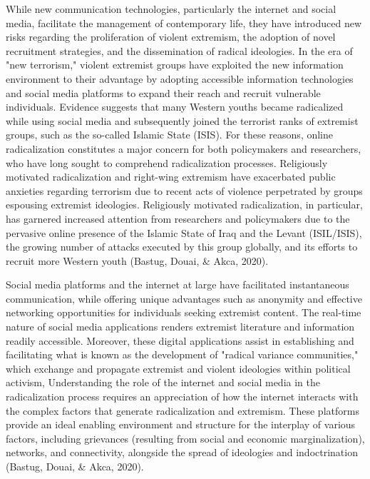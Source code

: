 \documentclass{NSP1}
\begin{document}
While new communication technologies, particularly the internet and social media, facilitate the management of contemporary life, they have introduced new risks regarding the proliferation of violent extremism, the adoption of novel recruitment strategies, and the dissemination of radical ideologies. In the era of "new terrorism," violent extremist groups have exploited the new information environment to their advantage by adopting accessible information technologies and social media platforms to expand their reach and recruit vulnerable individuals. Evidence suggests that many Western youths became radicalized while using social media and subsequently joined the terrorist ranks of extremist groups, such as the so-called Islamic State (ISIS). For these reasons, online radicalization constitutes a major concern for both policymakers and researchers, who have long sought to comprehend radicalization processes. Religiously motivated radicalization and right-wing extremism have exacerbated public anxieties regarding terrorism due to recent acts of violence perpetrated by groups espousing extremist ideologies. Religiously motivated radicalization, in particular, has garnered increased attention from researchers and policymakers due to the pervasive online presence of the Islamic State of Iraq and the Levant (ISIL/ISIS), the growing number of attacks executed by this group globally, and its efforts to recruit more Western youth (Bastug, Douai, \& Akca, 2020).

Social media platforms and the internet at large have facilitated instantaneous communication, while offering unique advantages such as anonymity and effective networking opportunities for individuals seeking extremist content. The real-time nature of social media applications renders extremist literature and information readily accessible. Moreover, these digital applications assist in establishing and facilitating what is known as the development of "radical variance communities," which exchange and propagate extremist and violent ideologies within political activism, Understanding the role of the internet and social media in the radicalization process requires an appreciation of how the internet interacts with the complex factors that generate radicalization and extremism. These platforms provide an ideal enabling environment and structure for the interplay of various factors, including grievances (resulting from social and economic marginalization), networks, and connectivity, alongside the spread of ideologies and indoctrination (Bastug, Douai, \& Akca, 2020).
\end{document}
